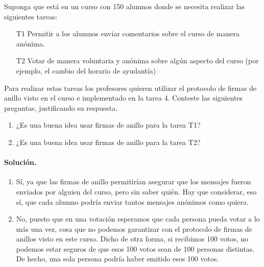 Suponga que está en un curso con 150 alumnos donde se necesita realizar las siguientes tareas:
\begin{itemize}
  \item[T1] Permitir a los alumnos enviar comentarios sobre el curso de manera anónima.

  \item[T2] Votar de manera voluntaria y anónima sobre algún aspecto del curso (por ejemplo, el cambio del horario de ayudantía)
\end{itemize}    
Para realizar estas tareas los profesores quieren utilizar el protocolo de firmas de anillo visto en el curso e implementado en la tarea 4. Conteste las siguientes preguntas, justificando su respuesta.
\begin{enumerate}
\item ¿Es una buena idea usar firmas de anillo para la tarea T1? 

\item ¿Es una buena idea usar firmas de anillo para la tarea T2? 
\end{enumerate}

\paragraph{Solución.}
\begin{enumerate}
\item Sí, ya que las firmas de anillo permitirían asegurar que los mensajes fueron enviados por alguien del curso, pero sin saber quién. Hay que considerar, eso sí, que cada alumno podría enviar tantos mensajes anónimos como quiera.

\item No, puesto que en una votación esperamos que cada persona pueda votar a lo más una vez, cosa que no podemos garantizar con el protocolo de firmas de anillos visto en este curso. Dicho de otra forma, si recibimos 100 votos, no podemos estar seguros de que esos 100 votos sean de 100 personas distintas. De hecho, una sola persona podría haber emitido esos 100 votos.
\end{enumerate}
